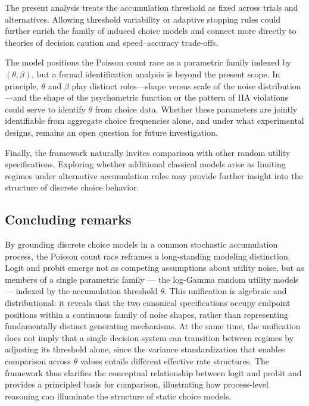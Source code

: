 \documentclass[
  man,
  floatsintext,
  longtable,
  a4paper,
  nolmodern,
  notxfonts,
  notimes,
  colorlinks=true,linkcolor=blue,citecolor=blue,urlcolor=blue]{apa7}
\begin{document}
The present analysis treats the accumulation threshold as fixed across
trials and alternatives. Allowing threshold variability or adaptive
stopping rules could further enrich the family of induced choice models
and connect more directly to theories of decision caution and
speed--accuracy trade-offs.

The model positions the Poisson count race as a parametric family
indexed by \((\theta, \beta)\), but a formal identification analysis is
beyond the present scope. In principle, \(\theta\) and \(\beta\) play
distinct roles---shape versus scale of the noise distribution---and the
shape of the psychometric function or the pattern of IIA violations
could serve to identify \(\theta\) from choice data. Whether these
parameters are jointly identifiable from aggregate choice frequencies
alone, and under what experimental designs, remains an open question for
future investigation.

Finally, the framework naturally invites comparison with other random
utility specifications. Exploring whether additional classical models
arise as limiting regimes under alternative accumulation rules may
provide further insight into the structure of discrete choice behavior.

\subsection{Concluding remarks}\label{concluding-remarks}

By grounding discrete choice models in a common stochastic accumulation
process, the Poisson count race reframes a long-standing modeling
distinction. Logit and probit emerge not as competing assumptions about
utility noise, but as members of a single parametric family --- the
log-Gamma random utility models --- indexed by the accumulation
threshold \(\theta\). This unification is algebraic and distributional:
it reveals that the two canonical specifications occupy endpoint
positions within a continuous family of noise shapes, rather than
representing fundamentally distinct generating mechanisms. At the same
time, the unification does not imply that a single decision system can
transition between regimes by adjusting its threshold alone, since the
variance standardization that enables comparison across \(\theta\)
values entails different effective rate structures. The framework thus
clarifies the conceptual relationship between logit and probit and
provides a principled basis for comparison, illustrating how
process-level reasoning can illuminate the structure of static choice
models.
\end{document}
